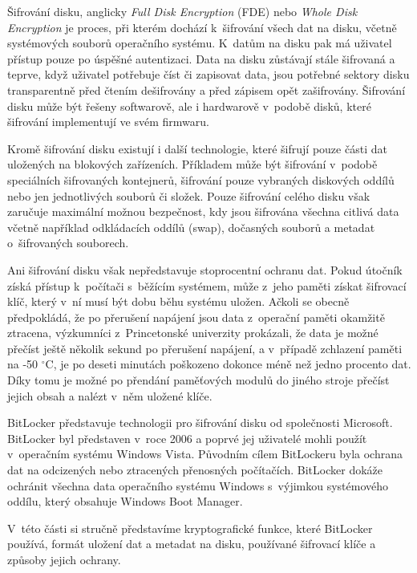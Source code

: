 \label{sec:fde}

Šifrování disku, anglicky \emph{Full Disk Encryption} (FDE) nebo \emph{Whole Disk Encryption} je proces, při kterém dochází k~šifrování všech dat na disku, včetně systémových souborů operačního systému. K~datům na disku pak má uživatel přístup pouze po úspěšné autentizaci. Data na disku zůstávají stále šifrovaná a teprve, když uživatel potřebuje číst či zapisovat data, jsou potřebné sektory disku transparentně před čtením dešifrovány a před zápisem opět zašifrovány. Šifrování disku může být řešeny softwarově, ale i hardwarově v~podobě disků, které šifrování implementují ve svém firmwaru.

Kromě šifrování disku existují i další technologie, které šifrují pouze části dat ulo\-že\-ných na blokových zařízeních. Příkladem může být šifrování v~podobě speciálních šifrovaných kontejnerů, šifrování pouze vybraných diskových oddílů nebo jen je\-dno\-tli\-vých souborů či složek. Pouze šifrování celého disku však zaručuje maximální možnou bez\-peč\-nost, kdy jsou šifrována všechna citlivá data včetně například odkládacích oddílů (swap), dočasných souborů a metadat o~ši\-fro\-va\-ných souborech.\cite{Scarfone2007}

Ani šifrování disku však nepředstavuje stoprocentní ochranu dat. Pokud útočník získá přístup k~počítači s~běžícím systémem, může z~jeho paměti získat šifrovací klíč, který v~ní musí být dobu běhu systému uložen. Ačkoli se obecně předpokládá, že po přerušení napájení jsou data z~operační paměti okamžitě ztracena, výzkumníci z~Princetonské univerzity prokázali, že data je možné přečíst ještě několik sekund po přerušení napájení, a v~případě zchlazení paměti na -50 $^{\circ}$C, je po deseti minutách poškozeno dokonce méně než jedno procento dat. Díky tomu je možné po přendání paměťových modulů do jiného stroje přečíst jejich obsah a nalézt v~něm uložené klíče.\cite{Halderman20090501}


BitLocker představuje technologii pro šifrování disku od společnosti Microsoft. BitLocker byl představen v~roce 2006 a poprvé jej uživatelé mohli použít v~ope\-rač\-ním systému Windows Vista. Původním cílem BitLockeru byla ochrana dat na odcizených nebo ztracených přenosných počítačích.\cite{Ferguson2006} BitLocker dokáže ochránit všechna data ope\-rač\-ní\-ho systému Windows s~výjimkou systémového oddílu, který obsahuje Windows Boot Manager.\cite{Hall20191}

V~této části si stručně představíme kryptografické funkce, které BitLocker používá, formát uložení dat a metadat na disku, používané šifrovací klíče a způsoby jejich ochrany.

